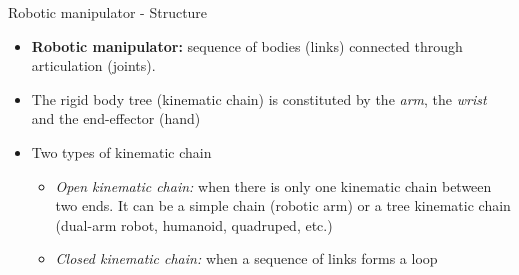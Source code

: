 \begin{frame}{Robotic manipulator - Structure}
	\begin{itemize}
		\item \textbf{Robotic manipulator:} sequence of bodies (links) connected through articulation (joints).
		\item The rigid body tree (kinematic chain) is constituted by the \emph{arm}, the \emph{wrist} and the end-effector (hand)
		\item Two types of kinematic chain
		\begin{itemize}
			\item \emph{Open kinematic chain:} when there is only one kinematic chain between two ends. It can be a simple chain (robotic arm) or a tree kinematic chain (dual-arm robot, humanoid, quadruped, etc.) 
			\item \emph{Closed kinematic chain:} when a sequence of links forms a loop
		\end{itemize}
	\end{itemize}
\end{frame}
